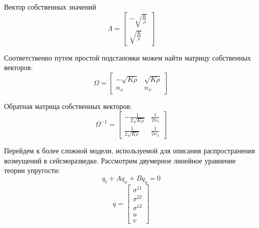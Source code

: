 \documentclass{article}
\begin{document}
Вектор собственных значений
\begin{equation}
\Lambda = \left[\begin{array}{cr}
-\sqrt{\frac{K}{\rho}}\\
\sqrt{\frac{K}{\rho}}
\end{array}\right] 
\end{equation}

Соответственно путем простой подстановки можем найти матрицу собственных векторов:
\begin{equation}
\Omega = \left[\begin{array}{cc}
-\sqrt{K \rho} & \sqrt{K \rho}\\
n_x & n_x \end{array}\right] 
\end{equation}

Обратная матрица собственных векторов:
\begin{equation}
 \Omega^{-1} = \left[\begin{array}{crl}
-\frac{1}{2 \sqrt{K \rho}} & \frac{1}{2 n_x} \\
\frac{1}{2 \sqrt{K \rho}} & \frac{1}{2 n_x}
\end{array}\right] 
\end{equation}

Перейдем к более сложной модели, используемой для описания распространения возмущений в сейсморазведке. Рассмотрим двумерное линейное уравнение теории упругости:
\begin{equation}
q_t + A q_x +  B q_y = 0 
\end{equation}
$$ q = \left[\begin{array}{crl}
\sigma^{11} \\
\sigma^{22} \\
\sigma^{12} \\
u \\
v
\end{array}\right] $$
\end{document}
